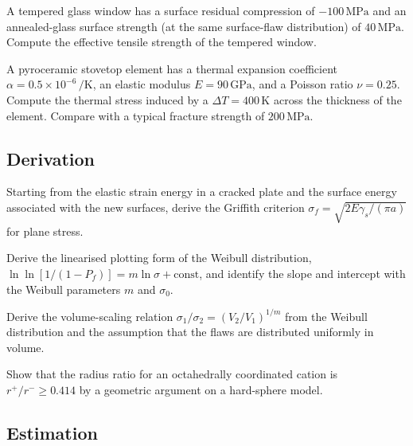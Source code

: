 \begin{exercise}
A tempered glass window has a surface residual compression of
$-100\,\text{MPa}$ and an annealed-glass surface strength (at the
same surface-flaw distribution) of $40\,\text{MPa}$. Compute the
effective tensile strength of the tempered window.
\end{exercise}

\begin{exercise}
A pyroceramic stovetop element has a thermal expansion coefficient
$\alpha = 0.5 \times 10^{-6}\,\si{\per\kelvin}$, an elastic modulus
$E = 90\,\text{GPa}$, and a Poisson ratio $\nu = 0.25$. Compute the
thermal stress induced by a $\Delta T = 400\,\si{\kelvin}$ across the
thickness of the element. Compare with a typical fracture strength of
$200\,\text{MPa}$.
\end{exercise}

\subsection*{Derivation}

\begin{exercise}
Starting from the elastic strain energy in a cracked plate and the
surface energy associated with the new surfaces, derive the Griffith
criterion $\sigma_f = \sqrt{2 E \gamma_s / (\pi a)}$ for plane stress.
\end{exercise}

\begin{exercise}
Derive the linearised plotting form of the Weibull distribution,
$\ln \ln[1/(1 - P_f)] = m \ln \sigma + \text{const}$, and identify
the slope and intercept with the Weibull parameters $m$ and
$\sigma_0$.
\end{exercise}

\begin{exercise}
Derive the volume-scaling relation $\sigma_1/\sigma_2 = (V_2/V_1)^{1/m}$
from the Weibull distribution and the assumption that the flaws are
distributed uniformly in volume.
\end{exercise}

\begin{exercise}
Show that the radius ratio for an octahedrally coordinated cation is
$r^+/r^- \geq 0.414$ by a geometric argument on a hard-sphere model.
\end{exercise}

\subsection*{Estimation}


